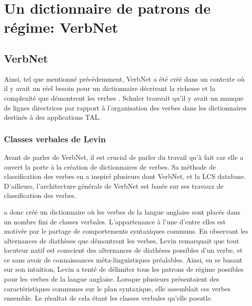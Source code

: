 
\chapter{Un dictionnaire de patrons de régime: VerbNet}

\section{VerbNet}

Ainsi, tel que mentionné précédemment, VerbNet a été créé dans un contexte où il y avait un réel besoin pour un dictionnaire décrivant la richesse et la complexité que démontrent les verbes \citep{KipperClassBasedConstructionVerb2000}. Schuler trouvait qu'il y avait un manque de lignes directrices par rapport à l'organisation des verbes dans les dictionnaires destinés à des applications \ac{TAL}. 

\subsection{Classes verbales de Levin}

Avant de parler de VerbNet, il est crucial de parler du travail qu'à fait \cite{verb-classes.levin.1993} car elle a ouvert la porte à la création de dictionnaires de verbes. Sa méthode de classification des verbes en a inspiré plusieurs dont VerbNet\cite{SchulerVerbnetBroadcoverageComprehensive2005}, et la LCS database\citep{AyanGeneratingParsingLexicon2002a}\citep{DorrUseLexicalSemantics1992}. D'ailleurs, l'architecture générale de VerbNet est basée sur ses travaux de classification des verbes.

\cite{verb-classes.levin.1993} a donc créé un dictionnaire où les verbes de la langue anglaise sont placés dans un nombre fini de classes verbales. L'appartenance à l'une d'entre elles est motivée par le partage de comportements syntaxiques communs. En observant les alternances de diathèses que démontrent les verbes, Levin remarquait que tout locuteur natif est conscient des alternances de diathèses possibles d'un verbe, et ce sans avoir de connaissances méta-linguistiques préalables. Ainsi, en se basant sur son intuition, Levin a tenté de délimiter tous les patrons de régime possibles pour les verbes de la langue anglaise. Lorsque plusieurs présentaient des caractéristiques communes sur le plan syntaxique, elle assemblait ces verbes ensemble. Le résultat de cela étant les classes verbales qu'elle posutle.

